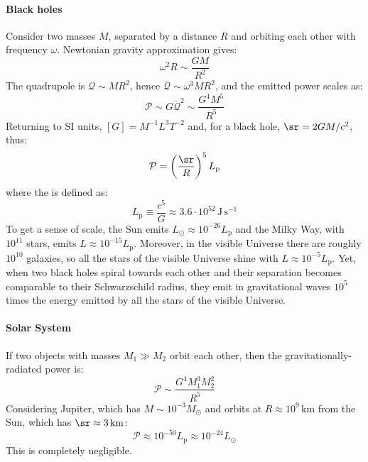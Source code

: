 \paragraph{Black holes}

Consider two masses $ M $, separated by a distance $ R $ and orbiting each other with frequency $ \omega $. Newtonian gravity approximation gives:
\begin{equation*}
  \omega^2 R \sim \frac{GM}{R^2}
\end{equation*}
The quadrupole is $ \mathcal{Q} \sim M R^2 $, hence $ \dddot{\mathcal{Q}} \sim \omega^3 M R^2 $, and the emitted power scales as:
\begin{equation*}
  \mathcal{P} \sim G \dddot{\mathcal{Q}}^2 \sim \frac{G^4 M^5}{R^5}
\end{equation*}
Returning to SI units, $ [G] = M^{-1} L^3 T^{-2} $ and, for a black hole, $ \sr = 2GM / c^2 $, thus:
\begin{equation*}
  \mathcal{P} = \left( \frac{\sr}{R} \right)^5 L_{\text{p}}
\end{equation*}
where the  is defined as:
\begin{equation*}
  L_{\text{p}} \equiv \frac{c^5}{G} \approx 3.6 \cdot 10^{52} \,\text{J}\,\text{s}^{-1}
\end{equation*}
To get a sense of scale, the Sun emits $ L_{\odot} \approx 10^{-26} L_{\text{p}} $ and the Milky Way, with $ 10^{11} $ stars, emits $ L \approx 10^{-15} L_{\text{p}} $. Moreover, in the visible Universe there are roughly $ 10^{10} $ galaxies, so all the stars of the visible Universe shine with $ L \approx 10^{-5} L_{\text{p}} $. Yet, when two black holes spiral towards each other and their separation becomes comparable to their Schwarzschild radius, they emit in gravitational waves $ 10^5 $ times the energy emitted by all the stars of the visible Universe.

\paragraph{Solar System}

If two objects with masses $ M_1 \gg M_2 $ orbit each other, then the gravitationally-radiated power is:
\begin{equation*}
  \mathcal{P} \sim \frac{G^4 M_1^3 M_2^2}{R^5}
\end{equation*}
Considering Jupiter, which has $ M \sim 10^{-3} M_{\odot} $ and orbits at $ R \approx 10^9\,\text{km} $ from the Sun, which has $ \sr \approx 3\,\text{km} $:
\begin{equation*}
  \mathcal{P} \approx 10^{-50} L_{\text{p}} \approx 10^{-24} L_{\odot}
\end{equation*}
This is completely negligible.

